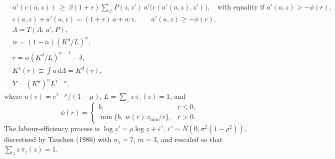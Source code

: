 \begin{align}
& u'(c(a,z)) \ \ge\ \beta(1+r)\sum_{z'} P(z,z')\, u'\big(c(a'(a,z),z')\big),
  \quad \text{with equality if } a'(a,z) > -\phi(r), \tag{E1}\\
& c(a,z) + a'(a,z) = (1+r)\,a + w\,z, \qquad a'(a,z) \ge -\phi(r), \tag{E2}\\
& \Lambda = T(\Lambda;\, a', P), \tag{E3}\\
& w = (1-\alpha)\left(K^d/L\right)^{\alpha}, \tag{E4}\\
& r = \alpha\left(K^d/L\right)^{\alpha-1} - \delta, \tag{E5}\\
& K^s(r) \equiv \int a\, d\Lambda = K^d(r), \tag{E6}\\
& Y = (K^d)^{\alpha} L^{1-\alpha}, \tag{E7}
\end{align}
where $u(c)=c^{1-\mu}/(1-\mu)$, $L=\sum_z z\,\pi_z(z)=1$, and
\[
\phi(r)=\begin{cases} b, & r\le 0,\\ \min\{b,\ w(r)\,z_{\min}/r\}, & r>0.\end{cases}
\]
The labour-efficiency process is $\log z'=\rho\log z+\varepsilon'$, $\varepsilon'\sim N(0,\sigma^2(1-\rho^2))$,
discretised by Tauchen (1986) with $n_z=7$, $m=3$, and rescaled so that $\sum_z z\,\pi_z(z)=1$.
